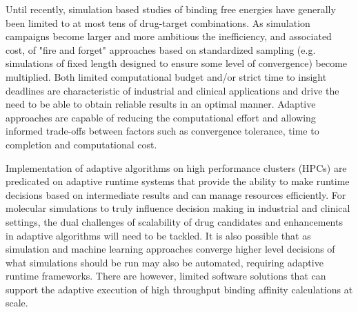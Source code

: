Until recently, simulation based studies of binding free energies have generally 
been limited to at most tens of drug-target combinations. 
As simulation campaigns become larger and more ambitious the inefficiency, and 
associated cost, of "fire and forget" approaches based on standardized sampling 
(e.g. simulations of fixed length designed to ensure some level of convergence) 
become multiplied.
Both limited computational budget and/or strict time to insight deadlines are 
characteristic of industrial and clinical applications and drive the need to be 
able to obtain reliable results in an optimal manner.
Adaptive approaches are capable of reducing the computational effort and 
allowing informed trade-offs between factors such as convergence tolerance, 
time to completion and computational cost.


Implementation of adaptive algorithms on high performance clusters (HPCs) are 
predicated on adaptive runtime systems that provide the ability to make runtime 
decisions based on intermediate results and can manage resources efficiently. 
For molecular simulations to truly influence decision making in industrial and 
clinical settings, the dual challenges of scalability of drug candidates and 
enhancements in adaptive algorithms will need to be tackled. 
It is also possible that as simulation and machine learning approaches converge 
higher level decisions of what simulations should be run may also be automated, 
requiring adaptive runtime frameworks. There are however, limited software 
solutions that can support the adaptive execution of high throughput binding 
affinity calculations at scale.



